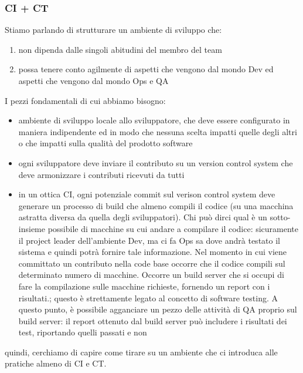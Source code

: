 \documentclass{article}
\begin{document}
\subsubsection{CI + CT}
Stiamo parlando di strutturare un ambiente di sviluppo che:
\begin{enumerate}
\item non dipenda dalle singoli abitudini del membro del team
\item possa tenere conto agilmente di aspetti che vengono dal mondo Dev ed aspetti che vengono dal mondo Ops e QA
\end{enumerate}
I pezzi fondamentali di cui abbiamo bisogno:
\begin{itemize}
\item ambiente di sviluppo locale allo sviluppatore, che deve essere configurato in maniera indipendente ed in modo che nessuna scelta impatti quelle degli altri o che impatti sulla qualità del prodotto software
\item ogni sviluppatore deve inviare il contributo su un version control system che deve armonizzare i contributi ricevuti da tutti
\item in un ottica CI, ogni potenziale commit sul verison control system deve generare un processo di build che almeno compili il codice (su una macchina astratta diversa da quella degli sviluppatori). Chi può dirci qual è un sotto-insieme possibile di macchine su cui andare a compilare il codice: sicuramente il project leader dell'ambiente Dev, ma ci fa Ops sa dove andrà testato il sistema e quindi potrà fornire tale informazione. Nel momento in cui viene committato un contributo nella code base occorre che il codice compili sul determinato numero di macchine. Occorre un build server che si occupi di fare la compilazione sulle macchine richieste, fornendo un report con i risultati.; questo è strettamente legato al concetto di software testing. A questo punto, è possibile agganciare un pezzo delle attività di QA proprio sul build server: il report ottenuto dal build server può includere i risultati dei test, riportando quelli passati e non
\end{itemize}
quindi, cerchiamo di capire come tirare su un ambiente che ci introduca alle pratiche almeno di CI e CT.
\end{document}
